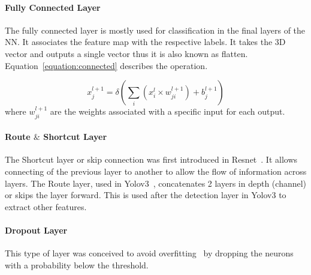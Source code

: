 \documentclass[conference]{IEEEtran}
\begin{document}
 

\paragraph{Fully Connected Layer}

The fully connected layer is mostly used for classification in the final layers
of the NN. It associates the feature map with the respective labels.  It takes the
3D vector and outputs a single vector thus it is also known as flatten.
Equation~\ref{equation:connected} describes the operation.

\begin{equation} \label{equation:connected}
     \displaystyle x_{j}^{l+1}=\delta (\sum_{i}(x_{i}^{l} \times w_{ji}^{l+1})+ b_{j}^{l+1})
\end{equation}
where $w_{ji}^{l+1}$ are the weights associated with a specific input for each output.


\paragraph{Route $\&$ Shortcut Layer}

The Shortcut layer or skip connection was first introduced in
Resnet~\cite{resnet}.  It allows connecting of the previous layer to another to
allow the flow of information across layers.  The Route layer, used in
Yolov3~\cite{yolov3}, concatenates 2 layers in depth (channel) or skips the
layer forward. This is used after the detection layer in Yolov3 to extract other
features.

\paragraph{Dropout Layer}

This type of layer was conceived to avoid overfitting~\cite{Dropout} by dropping
the neurons with a probability below the threshold. 
\end{document}

